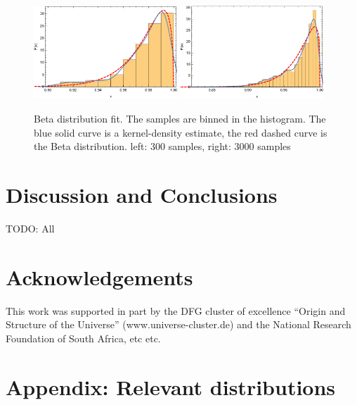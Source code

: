 \documentclass[11pt]{article}
\begin{document}
\begin{figure}[ht]
  \centering
  \includegraphics[width=0.48\textwidth]{beta-300}
  \includegraphics[width=0.48\textwidth]{beta-3000}
  \caption{Beta distribution fit. The samples are binned in the
    histogram. The blue solid curve is a kernel-density estimate, the
    red dashed curve is the Beta distribution. left: 300 samples,
    right: 3000 samples}
  \label{fig:beta}
\end{figure}

\section{Discussion and Conclusions}

TODO: All

\section*{Acknowledgements}

This work was supported in part by the DFG cluster of excellence
``Origin and Structure of the Universe'' (www.universe-cluster.de) and
the National Research Foundation of South Africa, etc etc.

\section{Appendix: Relevant distributions}
\end{document}
